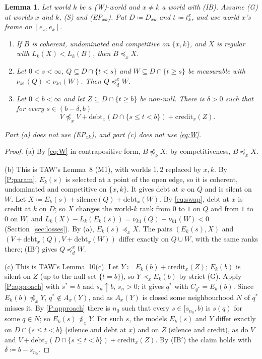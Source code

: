 \documentclass[11pt]{article}
\newtheorem{lemma}[theorem]{Lemma}
\theoremstyle{definition}\newtheorem{definition}[theorem]{Definition}
\theoremstyle{remark}\newtheorem{remark}[theorem]{Remark}
\newcommand{\debt}{\mathrm{debt}}
\newcommand{\cred}{\mathrm{credit}}
\newcommand{\sil}{\mathrm{silence}}
\begin{document}
\begin{lemma}\label{lem:forced}
Let world $k$ be a (W)-world and $x\ne k$ a world with (IB). Assume (G) at
worlds $x$ and $k$, (S) and (EP$_{xk}$). Put $D\coloneqq D_{xk}$ and
$t\coloneqq t^x_k$, and use world $x$'s frame on $[e_x,e_k]$.
\begin{enumerate}[label=(\alph*),leftmargin=*,itemsep=2pt]
\item If $B$ is coherent, undominated and competitive on $\{x,k\}$, and $X$
is regular with $L_k(X)<L_k(B)$, then $B\preceq_xX$.
\item Let $0<s<\infty$, $Q\subseteq D\cap\{t<s\}$ and $W\subseteq
D\cap\{t\ge s\}$ be measurable with $\nu_{k1}(Q)<\nu_{k1}(W)$. Then
$Q\preceq^x_dW$.
\item Let $0<b<\infty$ and let $Z\subseteq D\cap\{t\ge b\}$ be non-null.
There is $\delta>0$ such that for every $s\in(b-\delta,b)$
\[
 V\not\preceq_xV+\debt_x(D\cap\{s\le t<b\})+\cred_x(Z).
\]
\end{enumerate}
Part (a) does not use (EP$_{xk}$), and part (c) does not use \eqref{eq:W}.
\end{lemma}
\begin{proof}
(a) By \eqref{eq:W} in contrapositive form, $B\not\preceq_kX$; by
competitiveness, $B\preceq_xX$.

(b) This is TAW's Lemma~8 (M1), with worlds $1,2$ replaced by $x,k$. By
\ref{P:param}, $E_k(s)$ is selected at a point of the open edge, so it is
coherent, undominated and competitive on $\{x,k\}$. It gives debt at $x$ on
$Q$ and is silent on $W$. Let $X\coloneqq E_k(s)+\sil(Q)+\debt_x(W)$. By
\eqref{eq:swap}, debt at $x$ is credit at $k$ on $D$; so $X$ changes the
world-$k$ rank from $0$ to $1$ on $Q$ and from $1$ to $0$ on $W$, and
$L_k(X)-L_k(E_k(s))=\nu_{k1}(Q)-\nu_{k1}(W)<0$
(Section~\ref{sec:losses}). By (a), $E_k(s)\preceq_xX$. The pairs
$(E_k(s),X)$ and $(V+\debt_x(Q),V+\debt_x(W))$ differ exactly on $Q\cup W$,
with the same ranks there; (IB$'$) gives $Q\preceq^x_dW$.

(c) This is TAW's Lemma~10(c). Let $Y\coloneqq E_k(b)+\cred_x(Z)$; $E_k(b)$
is silent on $Z$ (up to the null set $\{t=b\}$), so $Y\prec_xE_k(b)$ by
strict (G). Apply \ref{P:approach} with $s^*=b$ and $s_n\uparrow b$,
$s_n>0$; it gives $q^*$ with $C_{q^*}=E_k(b)$. Since $E_k(b)\not\preceq_xY$,
$q^*\notin A_x(Y)$, and as $A_x(Y)$ is closed some neighbourhood $N$ of
$q^*$ misses it. By \ref{P:approach} there is $n_0$ such that every
$s\in[s_{n_0},b)$ is $s(q)$ for some $q\in N$; so $E_k(s)\not\preceq_xY$.
For such $s$, the models $E_k(s)$ and $Y$ differ exactly on
$D\cap\{s\le t<b\}$ (silence and debt at $x$) and on $Z$ (silence and
credit), as do $V$ and $V+\debt_x(D\cap\{s\le t<b\})+\cred_x(Z)$. By
(IB$'$) the claim holds with $\delta\coloneqq b-s_{n_0}$.
\end{proof}
\end{document}
